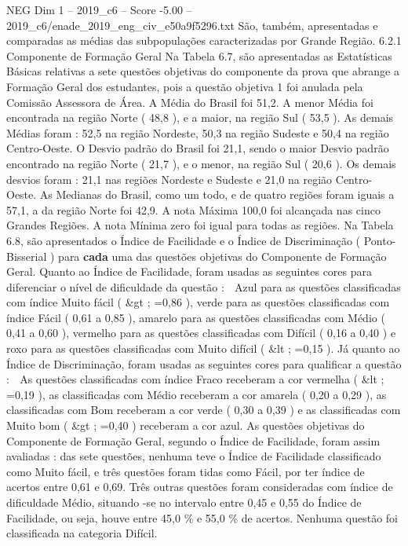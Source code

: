 \begin{textsample}{NEG Dim 1 – 2019\_c6 – Score -5.00 – 2019\_c6/enade\_2019\_eng\_civ\_e50a9f5296.txt}
São, também, apresentadas e comparadas as médias das subpopulações caracterizadas por Grande Região. 6.2.1 Componente de Formação Geral Na Tabela 6.7, são apresentadas as Estatísticas Básicas relativas a sete questões objetivas do componente da prova que abrange a Formação Geral dos estudantes, pois a questão objetiva 1 foi anulada pela Comissão Assessora de Área.
A Média do Brasil foi 51,2.
A menor Média foi encontrada na região Norte ( 48,8 ), e a maior, na região Sul ( 53,5 ).
As demais Médias foram : 52,5 na região Nordeste, 50,3 na região Sudeste e 50,4 na região Centro-Oeste.
O Desvio padrão do Brasil foi 21,1, sendo o maior Desvio padrão encontrado na região Norte ( 21,7 ), e o menor, na região Sul ( 20,6 ).
Os demais desvios foram : 21,1 nas regiões Nordeste e Sudeste e 21,0 na região Centro-Oeste.
As Medianas do Brasil, como um todo, e de quatro regiões foram iguais a 57,1, a da região Norte foi 42,9.
A nota Máxima 100,0 foi alcançada nas cinco Grandes Regiões.
A nota Mínima zero foi igual para todas as regiões.
Na Tabela 6.8, são apresentados o Índice de Facilidade e o Índice de Discriminação ( Ponto-Bisserial ) para \textbf{cada} uma das questões objetivas do Componente de Formação Geral.
Quanto ao Índice de Facilidade, foram usadas as seguintes cores para diferenciar o nível de dificuldade da questão :  Azul para as questões classificadas com índice Muito fácil ( \&gt ; =0,86 ), verde para as questões classificadas com índice Fácil ( 0,61 a 0,85 ), amarelo para as questões classificadas com Médio ( 0,41 a 0,60 ), vermelho para as questões classificadas com Difícil ( 0,16 a 0,40 ) e roxo para as questões classificadas com Muito difícil ( \&lt ; =0,15 ).
Já quanto ao Índice de Discriminação, foram usadas as seguintes cores para qualificar a questão :  As questões classificadas com índice Fraco receberam a cor vermelha ( \&lt ; =0,19 ), as classificadas com Médio receberam a cor amarela ( 0,20 a 0,29 ), as classificadas com Bom receberam a cor verde ( 0,30 a 0,39 ) e as classificadas com Muito bom ( \&gt ; =0,40 ) receberam a cor azul.
As questões objetivas do Componente de Formação Geral, segundo o Índice de Facilidade, foram assim avaliadas : das sete questões, nenhuma teve o Índice de Facilidade classificado como Muito fácil, e três questões foram tidas como Fácil, por ter índice de acertos entre 0,61 e 0,69.
Três outras questões foram consideradas com índice de dificuldade Médio, situando -se no intervalo entre 0,45 e 0,55 do Índice de Facilidade, ou seja, houve entre 45,0 \% e 55,0 \% de acertos.
Nenhuma questão foi classificada na categoria Difícil.

\end{textsample}
